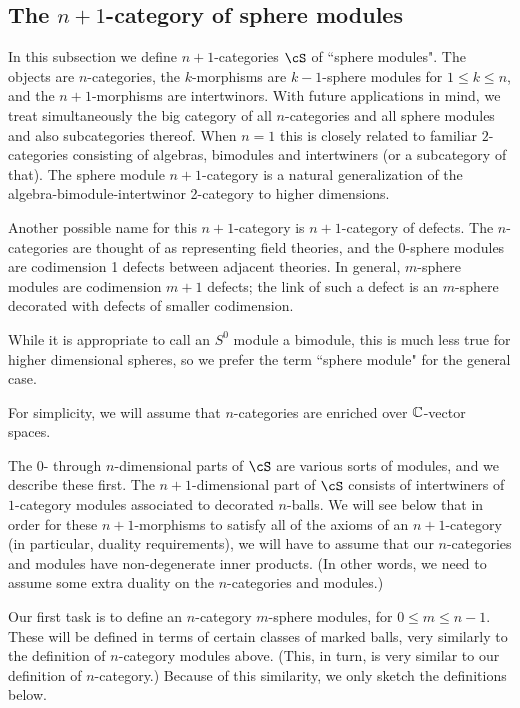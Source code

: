 \subsection{The \texorpdfstring{$n{+}1$}{n+1}-category of sphere modules}
\label{ssec:spherecat}

In this subsection we define $n{+}1$-categories $\cS$ of ``sphere modules".
The objects are $n$-categories, the $k$-morphisms are $k{-}1$-sphere modules for $1\le k \le n$,
and the $n{+}1$-morphisms are intertwinors.
With future applications in mind, we treat simultaneously the big category
of all $n$-categories and all sphere modules and also subcategories thereof.
When $n=1$ this is closely related to familiar $2$-categories consisting of 
algebras, bimodules and intertwiners (or a subcategory of that).
The sphere module $n{+}1$-category is a natural generalization of the 
algebra-bimodule-intertwinor 2-category to higher dimensions.

Another possible name for this $n{+}1$-category is $n{+}1$-category of defects.
The $n$-categories are thought of as representing field theories, and the 
$0$-sphere modules are codimension 1 defects between adjacent theories.
In general, $m$-sphere modules are codimension $m{+}1$ defects;
the link of such a defect is an $m$-sphere decorated with defects of smaller codimension.

\medskip

While it is appropriate to call an $S^0$ module a bimodule,
this is much less true for higher dimensional spheres, 
so we prefer the term ``sphere module" for the general case.

For simplicity, we will assume that $n$-categories are enriched over $\mathbb{C}$-vector spaces.

The $0$- through $n$-dimensional parts of $\cS$ are various sorts of modules, and we describe
these first.
The $n{+}1$-dimensional part of $\cS$ consists of intertwiners
of  $1$-category modules associated to decorated $n$-balls.
We will see below that in order for these $n{+}1$-morphisms to satisfy all of
the axioms of an $n{+}1$-category (in particular, duality requirements), we will have to assume
that our $n$-categories and modules have non-degenerate inner products.
(In other words, we need to assume some extra duality on the $n$-categories and modules.)

\medskip

Our first task is to define an $n$-category $m$-sphere modules, for $0\le m \le n-1$.
These will be defined in terms of certain classes of marked balls, very similarly
to the definition of $n$-category modules above.
(This, in turn, is very similar to our definition of $n$-category.)
Because of this similarity, we only sketch the definitions below.

